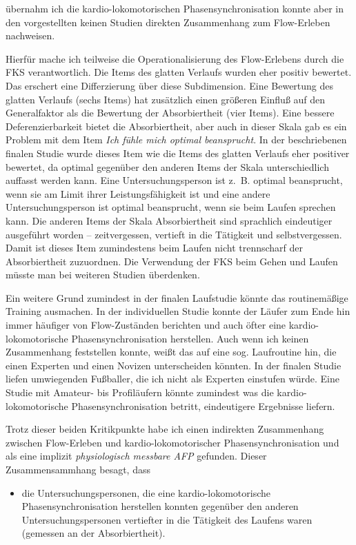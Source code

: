 übernahm ich die kardio-lokomotorischen Phasensynchronisation konnte aber in den vorgestellten keinen Studien direkten Zusammenhang zum Flow-Erleben nachweisen.

Hierfür mache ich teilweise die Operationalisierung des Flow-Erlebens durch die \ac{FKS} verantwortlich. Die Items des glatten Verlaufs wurden eher positiv bewertet. Das erschert eine Differzierung über diese Subdimension. Eine Bewertung des glatten Verlaufs (sechs Items) hat zusätzlich einen größeren Einfluß auf den Generalfaktor als die Bewertung der Absorbiertheit (vier Items). Eine bessere Deferenzierbarkeit bietet die Absorbiertheit, aber auch in dieser Skala gab es ein Problem mit dem Item \emph{Ich fühle mich optimal beansprucht}. In der beschriebenen finalen Studie wurde dieses Item wie die Items des glatten Verlaufs eher positiver bewertet, da optimal gegenüber den anderen Items der Skala unterschiedlich auffasst werden kann. Eine Untersuchungsperson ist z.~B. optimal beansprucht, wenn sie am Limit ihrer Leistungsfähigkeit ist und eine andere Untersuchungsperson ist optimal beansprucht, wenn sie beim Laufen sprechen kann. Die anderen Items der Skala Absorbiertheit sind sprachlich eindeutiger ausgeführt worden -- zeitvergessen, vertieft in die Tätigkeit und selbstvergessen. Damit ist dieses Item zumindestens beim Laufen nicht trennscharf der Absorbiertheit zuzuordnen. Die Verwendung der \ac{FKS} beim Gehen und Laufen müsste man bei weiteren Studien überdenken.

Ein weitere Grund zumindest in der finalen Laufstudie könnte das routinemäßige Training ausmachen. In der individuellen Studie konnte der Läufer zum Ende hin immer häufiger von Flow-Zuständen berichten und auch öfter eine kardio-lokomotorische Phasensynchronisation herstellen. Auch wenn ich keinen Zusammenhang feststellen konnte, weißt das auf eine sog. Laufroutine hin, die einen Experten und einen Novizen unterscheiden könnten. In der finalen Studie liefen umwiegenden Fußballer, die ich nicht als Experten einstufen würde. Eine Studie mit Amateur- bis Profiläufern könnte zumindest was die kardio-lokomotorische Phasensynchronisation betritt, eindeutigere Ergebnisse liefern.

Trotz dieser beiden Kritikpunkte habe ich einen indirekten Zusammenhang zwischen Flow-Erleben und kardio-lokomotorischer Phasensynchronisation und als eine implizit \emph{physiologisch messbare \ac{AFP}} gefunden. Dieser Zusammensammhang besagt, dass 

\begin{itemize}

	\item die Untersuchungspersonen, die eine kardio-lokomotorische Phasensynchronisation herstellen konnten gegenüber den anderen Untersuchungspersonen vertiefter in die Tätigkeit des Laufens waren (gemessen an der Absorbiertheit).

\end{itemize}


